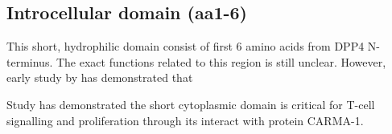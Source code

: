\subsection{Introcellular domain (aa1-6)}

This short, hydrophilic domain consist of first 6 amino acids from DPP4 N-terminus. The exact functions related to this region is still unclear. However, early study by has demonstrated that 

Study has demonstrated the short cytoplasmic domain is critical for T-cell signalling and proliferation through its interact with protein CARMA-1. \cite{Ohnuma_2007}